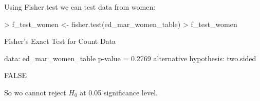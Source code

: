 \documentclass[a4paper]{article}
\begin{document}
\begin{itemize}
Using Fisher test we can test data from women:
\begin{Schunk}
\begin{Sinput}
> f_test_women <- fisher.test(ed_mar_women_table)
> f_test_women
\end{Sinput}
\begin{Soutput}
	Fisher's Exact Test for Count Data

data:  ed_mar_women_table
p-value = 0.2769
alternative hypothesis: two.sided
\end{Soutput}
\begin{Soutput}
[1] FALSE
\end{Soutput}
\end{Schunk}
So wo cannot reject $H_0$ at 0.05 significance level.
\end{itemize}
\end{document}
